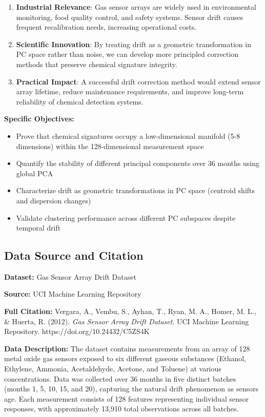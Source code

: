 \documentclass[
  letterpaper,
  DIV=11,
  numbers=noendperiod]{scrartcl}
\providecommand{\tightlist}{%
  \setlength{\itemsep}{0pt}\setlength{\parskip}{0pt}}
\begin{document}
\begin{enumerate}
\def\labelenumi{\arabic{enumi}.}
\item
  \textbf{Industrial Relevance}: Gas sensor arrays are widely used in
  environmental monitoring, food quality control, and safety systems.
  Sensor drift causes frequent recalibration needs, increasing
  operational costs.
\item
  \textbf{Scientific Innovation}: By treating drift as a geometric
  transformation in PC space rather than noise, we can develop more
  principled correction methods that preserve chemical signature
  integrity.
\item
  \textbf{Practical Impact}: A successful drift correction method would
  extend sensor array lifetime, reduce maintenance requirements, and
  improve long-term reliability of chemical detection systems.
\end{enumerate}

\textbf{Specific Objectives:}

\begin{itemize}
\tightlist
\item
  Prove that chemical signatures occupy a low-dimensional manifold (5-8
  dimensions) within the 128-dimensional measurement space
\item
  Quantify the stability of different principal components over 36
  months using global PCA
\item
  Characterize drift as geometric transformations in PC space (centroid
  shifts and dispersion changes)
\item
  Validate clustering performance across different PC subspaces despite
  temporal drift
\end{itemize}

\subsection{Data Source and Citation}\label{data-source-and-citation}

\textbf{Dataset:} Gas Sensor Array Drift Dataset

\textbf{Source:} UCI Machine Learning Repository

\textbf{Full Citation:} Vergara, A., Vembu, S., Ayhan, T., Ryan, M. A.,
Homer, M. L., \& Huerta, R. (2012). \emph{Gas Sensor Array Drift
Dataset}. UCI Machine Learning Repository.
https://doi.org/10.24432/C5ZS4K

\textbf{Data Description:} The dataset contains measurements from an
array of 128 metal oxide gas sensors exposed to six different gaseous
substances (Ethanol, Ethylene, Ammonia, Acetaldehyde, Acetone, and
Toluene) at various concentrations. Data was collected over 36 months in
five distinct batches (months 1, 5, 10, 15, and 20), capturing the
natural drift phenomenon as sensors age. Each measurement consists of
128 features representing individual sensor responses, with
approximately 13,910 total observations across all batches.
\end{document}
